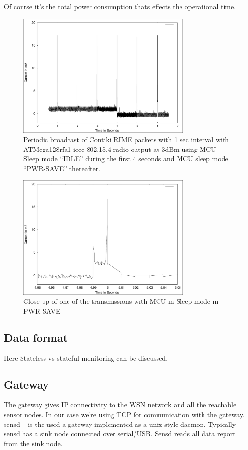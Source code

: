 \documentclass[conference, a4paper,10pt,twocolumn]{IEEEtran}
\begin{document}
Of course it's the total power consumption thats effects 
the operational time. 

\begin{figure}
\centering
    \includegraphics[width=3.4in]{bcast.eps}
    \caption{Periodic broadcast of Contiki RIME packets with 1 sec interval with ATMega128rfa1 ieee 802.15.4 radio output at 3dBm using MCU Sleep mode “IDLE” during the first 4 seconds and MCU sleep mode “PWR-SAVE” thereafter.}
    \label{fig:bcast}
\end{figure}


\begin{figure}
\centering
    \includegraphics[width=3.4in]{bcast-detail.eps}
    \caption{Close-up of one of the transmissions with MCU in Sleep mode in PWR-SAVE}
    \label{fig:bcast-detail}
\end{figure}



\subsection{Data format}
Here
Stateless vs stateful monitoring can be discussed. 


\subsection{Gateway}
The gateway gives IP connectivity to the WSN network and all the 
reachable sensor nodes. In our case we're using TCP for communication 
with the gateway.  sensd ~\cite{sensd} is the used a gateway implemented
as a unix style daemon. Typically sensd has a sink node connected over 
serial/USB. Sensd reads all data report from the sink node. 
\end{document}
